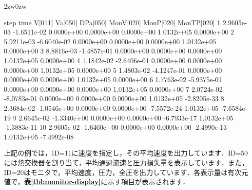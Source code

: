 \begin{indentation}{2zw}{0zw}
{\small 
\begin{program}
    step         time      V[011]     Va[050]    DPa[050]   MonV[020]   MonP[020]  MonTP[020]
       1   2.9605e-03 -1.6511e-02  0.0000e+00  0.0000e+00  0.0000e+00  1.0132e+05  0.0000e+00
       2   5.9211e-03 -6.6040e-02  0.0000e+00  0.0000e+00  0.0000e+00  1.0132e+05  0.0000e+00
       3   8.8816e-03 -1.4857e-01  0.0000e+00  0.0000e+00  0.0000e+00  1.0132e+05  0.0000e+00
       4   1.1842e-02 -2.6406e-01  0.0000e+00  0.0000e+00  0.0000e+00  1.0132e+05  0.0000e+00
       5   1.4803e-02 -4.1247e-01  0.0000e+00  0.0000e+00  0.0000e+00  1.0132e+05  0.0000e+00
       6   1.7763e-02 -5.9375e-01  0.0000e+00  0.0000e+00  0.0000e+00  1.0132e+05  0.0000e+00
       7   2.0724e-02 -8.0783e-01  0.0000e+00  0.0000e+00  0.0000e+00  1.0132e+05 -2.8205e-33
       8   2.3684e-02 -1.0546e+00  0.0000e+00  0.0000e+00 -7.5572e-24  1.0132e+05 -7.6584e-19
       9   2.6645e-02 -1.3340e+00  0.0000e+00  0.0000e+00 -6.7933e-17  1.0132e+05 -1.3883e-11
      10   2.9605e-02 -1.6460e+00  0.0000e+00  0.0000e+00 -2.4990e-13  1.0132e+05 -7.4992e-08
\end{program}
}

上記の例では，ID=11に速度を指定し，その平均速度を出力しています．ID=50には熱交換器を割り当て，平均通過流速と圧力損失量を表示しています．また，ID=20はモニタで，平均速度，圧力，全圧を出力しています．各表示量は有次元値で，\textbf{表\ref{tbl:monitor-display}}に示す項目が表示されます．


\end{indentation}
